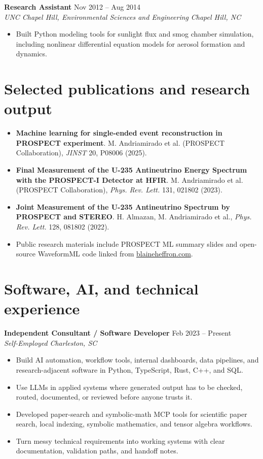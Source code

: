 \documentclass[10pt,letterpaper]{article}
\newcommand{\role}[4]{%
  \textbf{#1} \hfill #2\\
  \textit{#3} \hfill \textit{#4}\\[-2pt]
}
\begin{document}
\role{Research Assistant}{Nov 2012 -- Aug 2014}{UNC Chapel Hill, Environmental Sciences and Engineering}{Chapel Hill, NC}
\begin{itemize}
  \item Built Python modeling tools for sunlight flux and smog chamber simulation, including nonlinear differential equation models for aerosol formation and dynamics.
\end{itemize}

\newpage
\section*{Selected publications and research output}
\begin{itemize}
  \item \textbf{Machine learning for single-ended event reconstruction in PROSPECT experiment}. M. Andriamirado et al. (PROSPECT Collaboration), \textit{JINST} 20, P08006 (2025).
  \item \textbf{Final Measurement of the U-235 Antineutrino Energy Spectrum with the PROSPECT-I Detector at HFIR}. M. Andriamirado et al. (PROSPECT Collaboration), \textit{Phys. Rev. Lett.} 131, 021802 (2023).
  \item \textbf{Joint Measurement of the U-235 Antineutrino Spectrum by PROSPECT and STEREO}. H. Almazan, M. Andriamirado et al., \textit{Phys. Rev. Lett.} 128, 081802 (2022).
  \item Public research materials include PROSPECT ML summary slides and open-source WaveformML code linked from \href{https://blaineheffron.com}{blaineheffron.com}.
\end{itemize}

\section*{Software, AI, and technical experience}
\role{Independent Consultant / Software Developer}{Feb 2023 -- Present}{Self-Employed}{Charleston, SC}
\begin{itemize}
  \item Build AI automation, workflow tools, internal dashboards, data pipelines, and research-adjacent software in Python, TypeScript, Rust, C++, and SQL.
  \item Use LLMs in applied systems where generated output has to be checked, routed, documented, or reviewed before anyone trusts it.
  \item Developed paper-search and symbolic-math MCP tools for scientific paper search, local indexing, symbolic mathematics, and tensor algebra workflows.
  \item Turn messy technical requirements into working systems with clear documentation, validation paths, and handoff notes.
\end{itemize}
\end{document}
